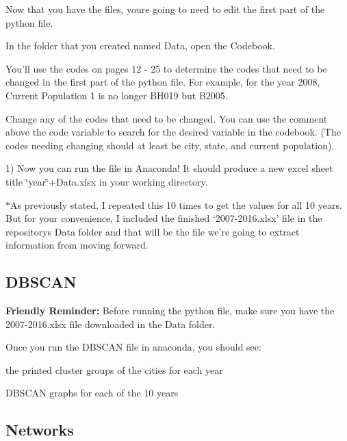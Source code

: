 \begin{DoxyItemize}
\item Now that you have the files, you\textquotesingle{}re going to need to edit the first part of the python file.
\item In the folder that you created named Data, open the Codebook.
\item You’ll use the codes on pages 12 -\/ 25 to determine the codes that need to be changed in the first part of the python file. For example, for the year 2008, Current Population 1 is no longer B\+H019 but B2005.
\item Change any of the codes that need to be changed. You can use the comment above the code variable to search for the desired variable in the codebook. (The codes needing changing should at least be city, state, and current population).
\end{DoxyItemize}

1) Now you can run the file in Anaconda! It should produce a new excel sheet title \char`\"{}year\char`\"{}+\+Data.xlsx in your working directory.

$\ast$\+As previously stated, I repeated this 10 times to get the values for all 10 years. But for your convenience, I included the finished ‘2007-\/2016.xlsx’ file in the repository\textquotesingle{}s Data folder and that will be the file we’re going to extract information from moving forward.

\subsection*{D\+B\+S\+C\+A\+N}

{\bfseries Friendly Reminder\+:} Before running the python file, make sure you have the \textquotesingle{}2007-\/2016.\+xlsx\textquotesingle{} file downloaded in the Data folder.

Once you run the D\+B\+S\+C\+A\+N file in anaconda, you should see\+:


\begin{DoxyItemize}
\item the printed cluster groups of the cities for each year
\item D\+B\+S\+C\+A\+N graphs for each of the 10 years
\end{DoxyItemize}

\subsection*{Networks}

